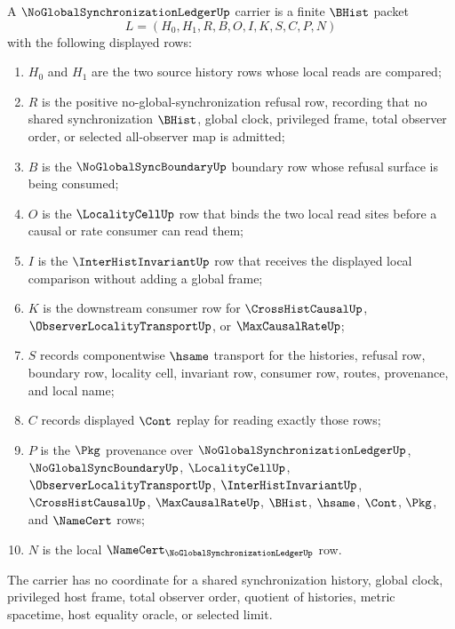 \begin{definition}
\label{def:no-global-synchronization-ledger-carrier}
A $\NoGlobalSynchronizationLedgerUp$ carrier is a finite $\BHist$ packet
$$
L=(H_0,H_1,R,B,O,I,K,S,C,P,N)
$$
with the following displayed rows:
\begin{enumerate}
\item $H_0$ and $H_1$ are the two source history rows whose local reads are compared;
\item $R$ is the positive no-global-synchronization refusal row, recording that no shared synchronization $\BHist$, global clock, privileged frame, total observer order, or selected all-observer map is admitted;
\item $B$ is the $\NoGlobalSyncBoundaryUp$ boundary row whose refusal surface is being consumed;
\item $O$ is the $\LocalityCellUp$ row that binds the two local read sites before a causal or rate consumer can read them;
\item $I$ is the $\InterHistInvariantUp$ row that receives the displayed local comparison without adding a global frame;
\item $K$ is the downstream consumer row for $\CrossHistCausalUp$, $\ObserverLocalityTransportUp$, or $\MaxCausalRateUp$;
\item $S$ records componentwise $\hsame$ transport for the histories, refusal row, boundary row, locality cell, invariant row, consumer row, routes, provenance, and local name;
\item $C$ records displayed $\Cont$ replay for reading exactly those rows;
\item $P$ is the $\Pkg$ provenance over $\NoGlobalSynchronizationLedgerUp$, $\NoGlobalSyncBoundaryUp$, $\LocalityCellUp$, $\ObserverLocalityTransportUp$, $\InterHistInvariantUp$, $\CrossHistCausalUp$, $\MaxCausalRateUp$, $\BHist$, $\hsame$, $\Cont$, $\Pkg$, and $\NameCert$ rows;
\item $N$ is the local $\NameCert_{\NoGlobalSynchronizationLedgerUp}$ row.
\end{enumerate}
The carrier has no coordinate for a shared synchronization history, global clock, privileged host frame, total observer order, quotient of histories, metric spacetime, host equality oracle, or selected limit.
\end{definition}

